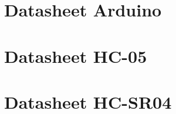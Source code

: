 \chapter{Datasheet Arduino}
\label{Anexo}




\chapter{Datasheet HC-05}
\label{Anexo}



\chapter{Datasheet HC-SR04}
\label{Anexo}





